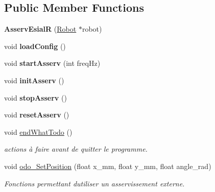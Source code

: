 \subsection*{Public Member Functions}
\begin{DoxyCompactItemize}
\item 
\mbox{\label{classAsservEsialR_adf4da92cf4d885cc744c970c7626fa0d}} 
{\bfseries Asserv\+EsialR} (\hyperlink{classRobot}{Robot} $\ast$robot)
\item 
\mbox{\label{classAsservEsialR_a571fca7d446ad307c51a37f3323ac187}} 
void {\bfseries load\+Config} ()
\item 
\mbox{\label{classAsservEsialR_a7a808d4593c732619d2d281faf150611}} 
void {\bfseries start\+Asserv} (int freq\+Hz)
\item 
\mbox{\label{classAsservEsialR_a558147f3a68a384944652e810e6491cb}} 
void {\bfseries init\+Asserv} ()
\item 
\mbox{\label{classAsservEsialR_a8917d11aef1998736c9e6e16dfe22de0}} 
void {\bfseries stop\+Asserv} ()
\item 
\mbox{\label{classAsservEsialR_ae80fe869f82c06b3e91fb8a783e56185}} 
void {\bfseries reset\+Asserv} ()
\item 
\mbox{\label{classAsservEsialR_af9caf754782c3ccfa468ab983d844c1e}} 
void \hyperlink{classAsservEsialR_af9caf754782c3ccfa468ab983d844c1e}{end\+What\+Todo} ()
\begin{DoxyCompactList}\small\item\em actions à faire avant de quitter le programme. \end{DoxyCompactList}\item 
\mbox{\label{classAsservEsialR_a9b3d60c1cb5f5eabe0857b16c46432d6}} 
void \hyperlink{classAsservEsialR_a9b3d60c1cb5f5eabe0857b16c46432d6}{odo\+\_\+\+Set\+Position} (float x\+\_\+mm, float y\+\_\+mm, float angle\+\_\+rad)
\begin{DoxyCompactList}\small\item\em Fonctions permettant d\textquotesingle{}utiliser un asservissement externe. \end{DoxyCompactList}\item 

\end{DoxyCompactItemize}

